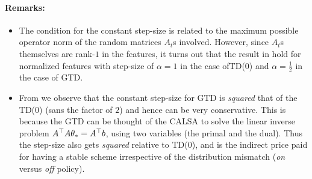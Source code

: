\paragraph{Remarks:} 
\begin{itemize}[leftmargin=*]
\item The condition for the constant step-size is related to the maximum possible operator norm of the random matrices $A_t$s involved. However, since $A_t$s themselves are rank-$1$ in the features, it turns out that the result in  hold for normalized features with step-size of $\alpha=1$ in the case ofTD(0) and $\alpha=\frac{1}{2}$ in the case of GTD.
\item From  we observe that the constant step-size for GTD is \emph{squared} that of the TD(0) (sans the factor of $2$) and hence can be very conservative. This is because the GTD can be thought of the CALSA to solve the linear inverse problem $A^\top A\theta_*=A^\top b$, using two variables (the primal and the dual). Thus the step-size also gets \emph{squared} relative to TD(0), and is the indirect price paid for having a stable scheme irrespective of the distribution mismatch (\emph{on} versus \emph{off} policy).
\end{itemize}